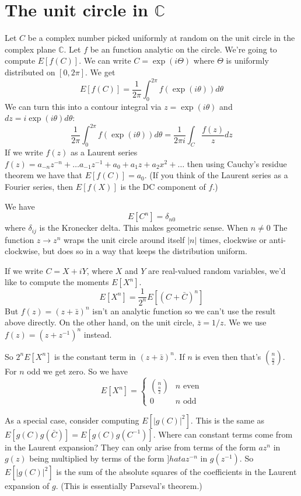 \documentclass{article}
\begin{document}
\section{The unit circle in $\mathbb{C}$}
Let $C$ be a complex number picked uniformly at random on the unit circle in the complex plane $\mathbb{C}$.
Let $f$ be an function analytic on the circle. We're going to compute $E[f(C)]$.
We can write $C=\exp(i\Theta)$ where $\Theta$ is uniformly distributed on $[0,2\pi]$.
We get
\[
E[f(C)] = \frac1{2\pi}\int_0^{2\pi}f(\exp(i\theta))d\theta
\]
We can turn this into a contour integral via $z=\exp(i\theta)$ and $dz=i\exp(i\theta)d\theta$:
\[
\frac1{2\pi}\int_0^{2\pi}f(\exp(i\theta))d\theta = \frac1{2\pi i}\int_C \frac{f(z)}{z} dz
\]
If we write $f(z)$ as a Laurent series $f(z)=a_{-n}z^{-n}+\ldots a_{-1}z^{-1}+a_0+a_1z+a_2x^2+\ldots$ then using Cauchy's residue theorem we have that $E[f(C)] = a_0$.
(If you think of the Laurent series as a Fourier series, then $E[f(X)]$ is the DC component of $f$.)

We have
\[
E[C^n]=\delta_{n0}
\]
where $\delta_{ij}$ is the Kronecker delta.
This makes geometric sense.
When $n\ne0$ The function $z\rightarrow z^n$ wraps the unit circle around itself $|n|$ times, clockwise or anti-clockwise, but does so in a way that keeps the distribution uniform.

If we write $C=X+iY$, where $X$ and $Y$ are real-valued random variables, we'd like to compute the moments $E[X^n]$.
\[
E[X^n] = \frac1{2^n}E[(C+\bar{C})^n]
\]
But $f(z)=(z+\bar{z})^n$ isn't an analytic function so we can't use the result above directly.
On the other hand, on the unit circle, $\bar{z}=1/z$.
We we use $f(z)=(z+z^{-1})^n$ instead.

So $2^nE[X^n]$ is the constant term in $(z+\bar{z})^n$.
If $n$ is even then that's ${n\choose{\frac n2}}$.
For $n$ odd we get zero. So we have
\[
E[X^n] = \begin{cases}
    {n \choose \frac n2} & n \text{ even}\\
    0 & n \text{ odd}
\end{cases}
\]

As a special case, consider computing $E[|g(C)|^2]$.
This is the same as $E[g(C)g(\bar{C})]=E[g(C)g(C^{-1})]$.
Where can constant terms come from in the Laurent expansion?
They can only arise from terms of the form $az^n$ in $g(z)$ being multiplied by terms of the form $]hat{a}z^{-n}$ in $g(z^{-1})$.
So $E[|g(C)|^2]$ is the sum of the absolute squares of the coefficients in the Laurent expansion of $g$.
(This is essentially Parseval's theorem.)
\end{document}
